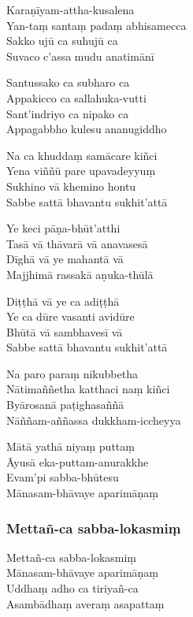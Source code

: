 
\begin{paritta}

Karaṇīyam-attha-kusalena\\
Yan-taṃ santaṃ padaṃ abhisamecca\\
Sakko ujū ca suhujū ca\\
Suvaco c'assa mudu anatimānī

Santussako ca subharo ca\\
Appakicco ca sallahuka-vutti\\
Sant'indriyo ca nipako ca\\
Appagabbho kulesu ananugiddho

Na ca khuddaṃ samācare kiñci\\
Yena viññū pare upavadeyyuṃ\\
Sukhino vā khemino hontu\\
Sabbe sattā bhavantu sukhit'attā

Ye keci pāṇa-bhūt'atthi\\
Tasā vā thāvarā vā anavasesā\\
Dīghā vā ye mahantā vā\\
Majjhimā rassakā aṇuka-thūlā

Diṭṭhā vā ye ca adiṭṭhā\\
Ye ca dūre vasanti avidūre\\
Bhūtā vā sambhavesī vā\\
Sabbe sattā bhavantu sukhit'attā

Na paro paraṃ nikubbetha\\
Nātimaññetha katthaci naṃ kiñci\\
Byārosanā paṭighasaññā\\
Nāññam-aññassa dukkham-iccheyya

Mātā yathā niyaṃ puttaṃ\\
Āyusā eka-puttam-anurakkhe\\
Evam'pi sabba-bhūtesu\\
Mānasam-bhāvaye aparimāṇaṃ

\subsubsection{Mettañ-ca sabba-lokasmiṃ}



Mettañ-ca sabba-lokasmiṃ\\
Mānasam-bhāvaye aparimāṇaṃ\\
Uddhaṃ adho ca tiriyañ-ca\\
Asambādhaṃ averaṃ asapattaṃ


\end{paritta}
